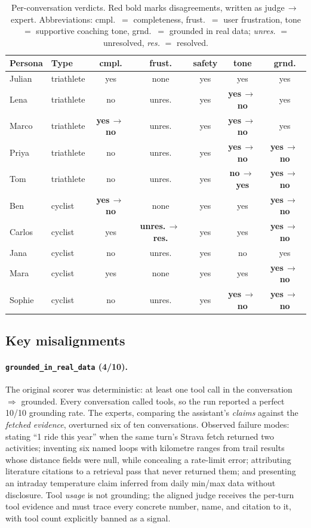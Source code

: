 \documentclass[11pt,a4paper]{article}
\newcommand{\mis}[2]{\textbf{\textcolor{red!70!black}{#1\,$\rightarrow$\,#2}}}
\newcommand{\scorer}[1]{\texttt{\small #1}}
\begin{document}
\begin{table}[h]
\centering
\caption{Per-conversation verdicts. Red bold marks disagreements, written as
judge\,$\rightarrow$\,expert. Abbreviations: cmpl.\ $=$ completeness, frust.\ $=$
user frustration, tone $=$ supportive coaching tone, grnd.\ $=$ grounded in
real data; \emph{unres.} $=$ unresolved, \emph{res.} $=$ resolved.}
\label{tab:matrix}
\small
\begin{tabular}{@{}llccccc@{}}
\toprule
Persona & Type & cmpl. & frust. & safety & tone & grnd. \\
\midrule
Julian & triathlete & yes & none   & yes & yes & yes \\
Lena   & triathlete & no  & unres. & yes & \mis{yes}{no} & yes \\
Marco  & triathlete & \mis{yes}{no} & unres. & yes & \mis{yes}{no} & yes \\
Priya  & triathlete & no  & unres. & yes & \mis{yes}{no} & \mis{yes}{no} \\
Tom    & triathlete & no  & unres. & yes & \mis{no}{yes} & \mis{yes}{no} \\
\addlinespace
Ben    & cyclist    & \mis{yes}{no} & none & yes & yes & \mis{yes}{no} \\
Carlos & cyclist    & yes & \mis{unres.}{res.} & yes & yes & \mis{yes}{no} \\
Jana   & cyclist    & no  & unres. & yes & no  & yes \\
Mara   & cyclist    & yes & none   & yes & yes & \mis{yes}{no} \\
Sophie & cyclist    & no  & unres. & yes & \mis{yes}{no} & \mis{yes}{no} \\
\bottomrule
\end{tabular}
\end{table}

\subsection{Key misalignments}

\paragraph{\scorer{grounded\_in\_real\_data} (4/10).} The original scorer was
deterministic: at least one tool call in the conversation $\Rightarrow$
grounded. Every conversation called tools, so the run reported a perfect 10/10
grounding rate. The experts, comparing the assistant's \emph{claims} against
the \emph{fetched evidence}, overturned six of ten conversations. Observed
failure modes: stating ``1 ride this year'' when the same turn's Strava fetch
returned two activities; inventing six named loops with kilometre ranges from
trail results whose distance fields were null, while concealing a rate-limit
error; attributing literature citations to a retrieval pass that never returned
them; and presenting an intraday temperature claim inferred from daily min/max
data without disclosure. Tool \emph{usage} is not grounding; the aligned judge
receives the per-turn tool evidence and must trace every concrete number, name,
and citation to it, with tool count explicitly banned as a signal.
\end{document}
